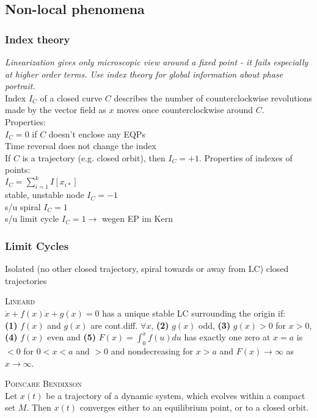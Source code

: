 \subsection{Non-local phenomena}
\subsubsection{Index theory}
\emph{Linearization gives only microscopic view around a fixed point - it fails especially at higher order terms. Use index theory for global information about phase portrait.}\\
Index $I_C$ of a closed curve $C$ describes the number of counterclockwise revolutions made by the vector field as $x$ moves once counterclockwise around $C$.\\
Properties:\\
$I_C=0$ if $C$ doesn't enclose any EQPs\\
Time reversal does not change the index\\
If $C$ is a trajectory (e.g. closed orbit), then $I_C=+1$.\vspace{0.1cm}
Properties of indexes of points:\\
$I_C=\sum_{i=1}^k I[x_{i*}]$\\
stable, unstable node $I_C = -1$\\
s/u spiral $I_C = 1$\\
s/u limit cycle $I_C = 1 \rightarrow$ wegen EP im Kern
\subsubsection{Limit Cycles}
Isolated (no other closed trajectory, spiral towards or away from LC) closed trajectories

\textsc{Lineard}\\
$\ddot{x}+f(x) \dot{x} + g(x)=0$ has a unique stable LC surrounding the origin if:\\
\textbf{(1)} $f(x)$ and $g(x)$ are cont.diff. $\forall x$, \textbf{(2)} $g(x)$ odd, \textbf{(3)} $g(x)>0$ for $x>0$, \textbf{(4)} $f(x)$ even and \textbf{(5)} $F(x)=\int_0^x f(u)du$ has exactly one zero at $x=a$ is $<0$ for $0<x<a$ and $>0$ and nondecreasing for $x>a$ and $F(x)\rightarrow\infty$ as $x\rightarrow \infty$.\vspace{0.2cm}

\textsc{Poincare Bendixson}\\
Let $x(t)$ be a trajectory of a dynamic system, which evolves within a compact set $M$. Then $x(t)$ converges either to an equilibrium point, or to a closed orbit.\vspace{0.2cm}

